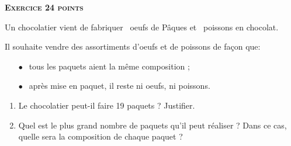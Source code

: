 \textbf{\textsc{Exercice 2\hfill 4 points}}

\medskip

Un chocolatier vient de fabriquer ~oeufs de Pâques et ~poissons en chocolat.

Il souhaite vendre des assortiments d'oeufs et de poissons de façon que:

\setlength\parindent{6mm}
\begin{itemize}
\item[$\bullet~~$] tous les paquets aient la même composition ;
\item[$\bullet~~$] après mise en paquet, il reste ni oeufs, ni poissons.
\end{itemize}
\setlength\parindent{0mm}

\medskip

\begin{enumerate}
\item Le chocolatier peut-il faire 19 paquets ? Justifier.
\item Quel est le plus grand nombre de paquets qu'il peut réaliser ? Dans ce cas, quelle
sera la composition de chaque paquet ?
\end{enumerate}

\vspace{0.5cm}

